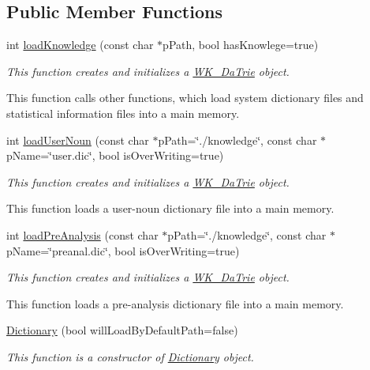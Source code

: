 \subsection*{Public Member Functions}
\begin{CompactItemize}
\item 
int \hyperlink{classkmaOrange_1_1Dictionary_22a1dd6af0f8698ff758de165ba5b613}{loadKnowledge} (const char $\ast$pPath, bool hasKnowlege=true)
\begin{CompactList}\small\item\em This function creates and initializes a \hyperlink{classkmaOrange_1_1WK__DaTrie}{WK\_\-DaTrie} object.\par
 This function calls other functions, which load system dictionary files and statistical information files into a main memory. \item\end{CompactList}\item 
int \hyperlink{classkmaOrange_1_1Dictionary_c0b9ddb423ad674ff15a77ee9663a641}{loadUserNoun} (const char $\ast$pPath=\char`\"{}./knowledge\char`\"{}, const char $\ast$pName=\char`\"{}user.dic\char`\"{}, bool isOverWriting=true)
\begin{CompactList}\small\item\em This function creates and initializes a \hyperlink{classkmaOrange_1_1WK__DaTrie}{WK\_\-DaTrie} object.\par
 This function loads a user-noun dictionary file into a main memory. \item\end{CompactList}\item 
int \hyperlink{classkmaOrange_1_1Dictionary_8a78b756e3a98be8ded1f5a38b5bd4ae}{loadPreAnalysis} (const char $\ast$pPath=\char`\"{}./knowledge\char`\"{}, const char $\ast$pName=\char`\"{}preanal.dic\char`\"{}, bool isOverWriting=true)
\begin{CompactList}\small\item\em This function creates and initializes a \hyperlink{classkmaOrange_1_1WK__DaTrie}{WK\_\-DaTrie} object.\par
 This function loads a pre-analysis dictionary file into a main memory. \item\end{CompactList}\item 
\hyperlink{classkmaOrange_1_1Dictionary_8a745b21ae847b6763db962023ee7656}{Dictionary} (bool willLoadByDefaultPath=false)
\begin{CompactList}\small\item\em This function is a constructor of \hyperlink{classkmaOrange_1_1Dictionary}{Dictionary} object. \item\end{CompactList}\item 

\end{CompactItemize}
